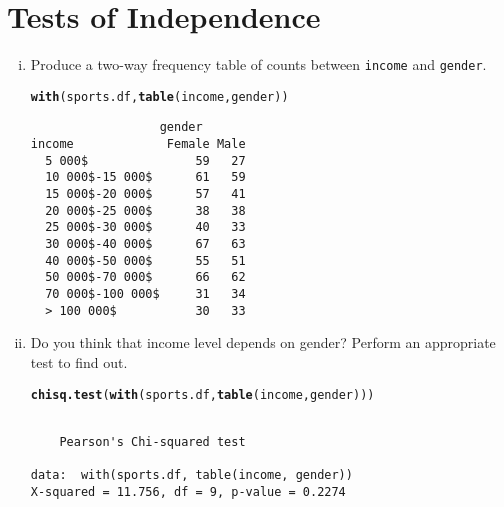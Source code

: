\documentclass[12pt,a4paper]{article}\usepackage[]{graphicx}\usepackage[]{color}
\makeatletter
\newcommand{\hlstd}[1]{\textcolor[rgb]{0.345,0.345,0.345}{#1}}%
\newcommand{\hlkwd}[1]{\textcolor[rgb]{0.737,0.353,0.396}{\textbf{#1}}}%
\newenvironment{kframe}{%
 \def\at@end@of@kframe{}%
 \ifinner\ifhmode%
  \def\at@end@of@kframe{\end{minipage}}%
  \begin{minipage}{\columnwidth}%
 \fi\fi%
 \def\FrameCommand##1{\hskip\@totalleftmargin \hskip-\fboxsep
 \colorbox{shadecolor}{##1}\hskip-\fboxsep
     \hskip-\linewidth \hskip-\@totalleftmargin \hskip\columnwidth}%
 \MakeFramed {\advance\hsize-\width
   \@totalleftmargin\z@ \linewidth\hsize
   \@setminipage}}%
 {\par\unskip\endMakeFramed%
 \at@end@of@kframe}
\newenvironment{knitrout}{}{} %
\makeatother
\begin{document}
\section{Tests of Independence} 
\label{sec:ind}
\begin{enumerate}[(i)]
\item Produce a two-way frequency table of counts between \texttt{income} and \texttt{gender}.
\begin{knitrout}
\color{fgcolor}\begin{kframe}
\begin{alltt}
\hlkwd{with}\hlstd{(sports.df,} \hlkwd{table}\hlstd{(income, gender))}
\end{alltt}
\begin{verbatim}
                  gender
income             Female Male
  5 000$               59   27
  10 000$-15 000$      61   59
  15 000$-20 000$      57   41
  20 000$-25 000$      38   38
  25 000$-30 000$      40   33
  30 000$-40 000$      67   63
  40 000$-50 000$      55   51
  50 000$-70 000$      66   62
  70 000$-100 000$     31   34
  > 100 000$           30   33
\end{verbatim}
\end{kframe}
\end{knitrout}
\item Do you think that income level depends on gender? Perform an appropriate test to find out.
\begin{knitrout}
\color{fgcolor}\begin{kframe}
\begin{alltt}
\hlkwd{chisq.test}\hlstd{(}\hlkwd{with}\hlstd{(sports.df,} \hlkwd{table}\hlstd{(income, gender)))}
\end{alltt}
\begin{verbatim}

	Pearson's Chi-squared test

data:  with(sports.df, table(income, gender))
X-squared = 11.756, df = 9, p-value = 0.2274
\end{verbatim}
\end{kframe}
\end{knitrout}

\end{enumerate}
\end{document}
